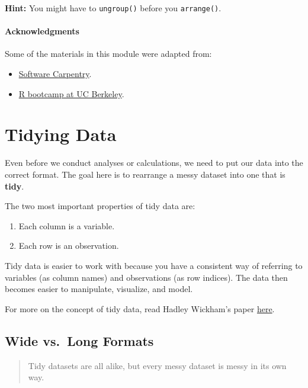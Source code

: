 \documentclass[]{book}
\providecommand{\tightlist}{%
  \setlength{\itemsep}{0pt}\setlength{\parskip}{0pt}}
\begin{document}
\textbf{Hint:} You might have to \texttt{ungroup()} before you
\texttt{arrange()}.

\subsubsection*{Acknowledgments}\label{acknowledgments-2}

Some of the materials in this module were adapted from:

\begin{itemize}
\tightlist
\item
  \href{http://swcarpentry.github.io/r-novice-gapminder/}{Software
  Carpentry}.
\item
  \href{https://github.com/berkeley-scf/r-bootcamp-fall-2019}{R bootcamp
  at UC Berkeley}.
\end{itemize}

\chapter{Tidying Data}\label{tidying-data}

Even before we conduct analyses or calculations, we need to put our data
into the correct format. The goal here is to rearrange a messy dataset
into one that is \textbf{tidy}.

The two most important properties of tidy data are:

\begin{enumerate}
\def\labelenumi{\arabic{enumi})}
\tightlist
\item
  Each column is a variable.
\item
  Each row is an observation.
\end{enumerate}

Tidy data is easier to work with because you have a consistent way of
referring to variables (as column names) and observations (as row
indices). The data then becomes easier to manipulate, visualize, and
model.

For more on the concept of tidy data, read Hadley Wickham's paper
\href{http://vita.had.co.nz/papers/tidy-data.html}{here}.

\section{Wide vs.~Long Formats}\label{wide-vs.long-formats}

\begin{quote}
Tidy datasets are all alike, but every messy dataset is messy in its own
way.
\end{quote}
\end{document}
